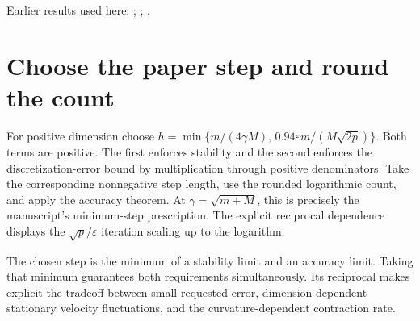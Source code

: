 \documentclass[11pt,a4paper]{article}
\begin{document}
Earlier results used here: \cite[Section~3.17.3]{LangevinLean2026ULASC}; \cite[Section~3.17.4]{LangevinLean2026ULASC}; \cite[Section~3.26.3]{LangevinLean2026ULASC}.

\section{\texorpdfstring{Choose the paper step and round the count}{Choose the paper step and round the count}}


For positive dimension choose \(h=\min\{m/(4\gamma M),\,0.94\varepsilon m/(M\sqrt{2p})\}\). Both terms are positive. The first enforces stability and the second enforces the discretization-error bound by multiplication through positive denominators. Take the corresponding nonnegative step length, use the rounded logarithmic count, and apply the accuracy theorem. At \(\gamma=\sqrt{m+M}\), this is precisely the manuscript’s minimum-step prescription. The explicit reciprocal dependence displays the \(\sqrt p/\varepsilon\) iteration scaling up to the logarithm.



The chosen step is the minimum of a stability limit and an accuracy limit. Taking that minimum guarantees both requirements simultaneously. Its reciprocal makes explicit the tradeoff between small requested error, dimension-dependent stationary velocity fluctuations, and the curvature-dependent contraction rate.
\end{document}
